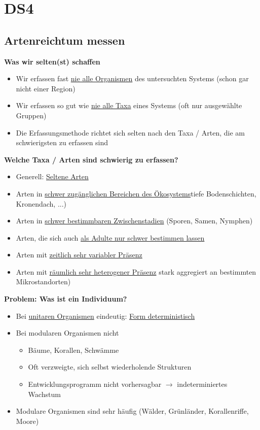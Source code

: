 \section{DS4}
\subsection{Artenreichtum messen}
\textbf{Was wir selten(st) schaffen}
\begin{itemize}
	\item Wir erfassen fast \underline{nie alle Organismen} des untersuchten Systems (schon gar nicht einer Region)
	\item Wir erfassen so gut wie \underline{nie alle Taxa} eines Systems (oft nur ausgewählte Gruppen)
	\item Die Erfassungsmethode richtet sich selten nach den Taxa / Arten, die am schwierigsten zu erfassen sind
\end{itemize}

\textbf{Welche Taxa / Arten sind schwierig zu erfassen?}
\begin{itemize}
	\item Generell: \underline{Seltene Arten}
	\item Arten in \underline{schwer zugänglichen Bereichen des Ökosystems}tiefe Bodenschichten, Kronendach, ...)
	\item Arten in \underline{schwer bestimmbaren Zwischenstadien} (Sporen, Samen, Nymphen)
	\item Arten, die sich auch \underline{als Adulte nur schwer bestimmen lassen}
	\item Arten mit \underline{zeitlich sehr variabler Präsenz}
	\item Arten mit \underline{räumlich sehr heterogener Präsenz} stark aggregiert an bestimmten Mikrostandorten)
\end{itemize}

\textbf{Problem: Was ist ein Individuum?}
\begin{itemize}
	\item Bei \underline{unitaren Organismen} eindeutig: \underline{Form deterministisch}
	\item Bei modularen Organismen nicht
	\begin{itemize}
		\item Bäume, Korallen, Schwämme
		\item Oft verzweigte, sich selbst wiederholende Strukturen
		\item Entwicklungsprogramm nicht vorhersagbar $\rightarrow$ indeterminiertes Wachstum
	\end{itemize}
	\item Modulare Organismen sind sehr häufig (Wälder, Grünländer, Korallenriffe, Moore)
\end{itemize}

